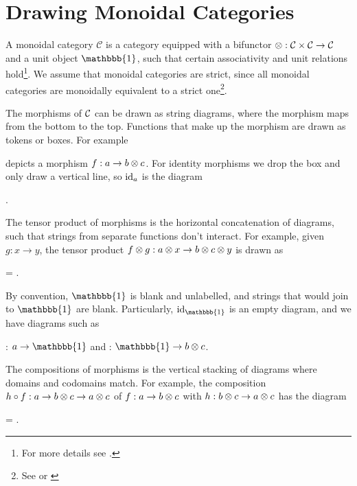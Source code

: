 \section{Drawing Monoidal Categories}
\label{sec:2.1}

A monoidal category $\mathcal{C}$ is a category equipped with a bifunctor $\otimes: \mathcal{C} \times \mathcal{C} \to \mathcal{C}$ and a unit object $\mathbbb{1}$, such that certain associativity and unit relations hold\footnote{For more details see \cite{tensor-categories}.}. We assume that monoidal categories are strict, since all monoidal categories are monoidally equivalent to a strict one\footnote{See \cite[\nopp VII.2]{maclane-category-theory} or \cite[Thm 2.8.5]{tensor-categories}}.

The morphisms of $\mathcal{C}$ can be drawn as string diagrams, where the morphism maps from the bottom to the top. Functions that make up the morphism are drawn as tokens or boxes. For example
\begin{center}
\end{center}
depicts a morphism $f: a \to b \otimes c$. For identity morphisms we drop the box and only draw a vertical line, so $\operatorname{id}_a$ is the diagram
\begin{center}
    .
\end{center}
The tensor product of morphisms is the horizontal concatenation of diagrams, such that strings from separate functions don't interact. For example, given $g:x \to y$, the tensor product $f \otimes g: a \otimes x \to b \otimes c \otimes y$ is drawn as
\begin{center}
    =
    .
\end{center}
By convention, $\mathbbb{1}$ is blank and unlabelled, and strings that would join to $\mathbbb{1}$ are blank. Particularly, $\id_\mathbbb{1}$ is an empty diagram, and we have diagrams such as
\begin{center}
    : $a \to \mathbbb{1}$
    \quad and \quad
    : $\mathbbb{1} \to b \tensor c$.
\end{center}
The compositions of morphisms is the vertical stacking of diagrams where domains and codomains match. For example, the composition $h \circ f: a \to b \otimes c \to a \otimes c$ of $f: a \to b \otimes c$ with $h: b \otimes c \to a \otimes c$ has the diagram
\begin{center}
    =
    .
\end{center}

